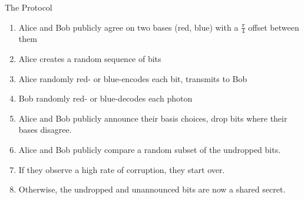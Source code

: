 \documentclass[pdf]{beamer}
\begin{document}
\begin{frame}{The Protocol}
  \begin{enumerate}
  \item Alice and Bob publicly agree on two bases (red, blue) with a
    $\frac{\pi}{4}$ offset between them
  \item Alice creates a random sequence of bits
  \item Alice randomly red- or blue-encodes each bit, transmits to Bob
  \item Bob randomly red- or blue-decodes each photon
  \item Alice and Bob publicly announce their basis choices, drop bits where
their bases disagree.
  \item Alice and Bob publicly compare a random subset of the undropped bits.
  \item If they observe a high rate of corruption, they start over.
  \item Otherwise, the undropped and unannounced bits are now a shared secret.
  \end{enumerate}
\end{frame}
\end{document}
